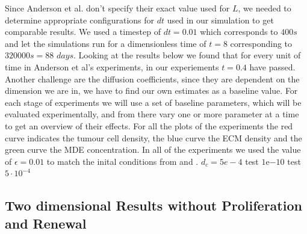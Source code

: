 Since Anderson et al. don't specify their exact value used for $L$, we needed to determine appropriate configurations for $dt$ used in our simulation to get comparable results. We used a timestep of $dt=0.01$ which corresponds to $400s$ and let the simulations run for a dimensionless time of $t=8$ corresponding to $320000s=88$ $days$. Looking at the results below we found that for every unit of time in Anderson et al's experiments, in our experiements $t=0.4$ have passed.\newline 
Another challenge are the diffusion coefficients, since they are dependent on the dimension we are in, we have to find our own estimates as a baseline value. \newline 
For each stage of experiments we will use a set of baseline parameters, which will be evaluated experimentally, and from there vary one or more parameter at a time to get an overview of their effects. \newline
For all the plots of the experiments the red curve indicates the tumour cell density, the blue curve the ECM density and the green curve the MDE concentration. In all of the experiments we used the value of $\epsilon = 0.01$ to match the inital conditions from \cite{anderson_mathematical_2000} and \cite{Kolev2010}. \newline 
$d_c=5e-4$ test $1\mathrm{e}{-10}$ test $5\cdot 10^{-4}$


\subsection{Two dimensional Results without Proliferation and Renewal}

